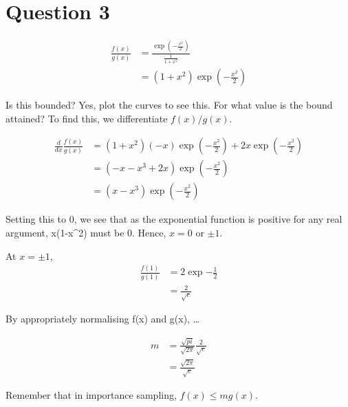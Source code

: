 \documentclass{amsart}
\begin{document}
\section{Question 3}
\begin{align*}
\frac{f(x)}{g(x)} &= \frac{\exp{(-\frac{x^2}{2})}}{\frac{1}{1+x^2}} \\
&= (1+x^2) \exp{(-\frac{x^2}{2})}
\end{align*}

Is this bounded? Yes, plot the curves to see this.
For what value is the bound attained? To find this, we differentiate $f(x)/g(x)$.

\begin{align*}
\frac{d}{dx} \frac{f(x)}{g(x)} &= (1+x^2)(-x) \exp{(-\frac{x^2}{2})} + 2x \exp{(-\frac{x^2}{2})} \\
&= (-x -x^3 + 2x)  \exp{(-\frac{x^2}{2})} \\
&= (x - x^3) \exp{(-\frac{x^2}{2})}
\end{align*}

Setting this to 0, we see that as the exponential function is positive for any real argument,
x(1-x^2) must be 0. Hence, $x=0$ or $\pm 1$.

At $x = \pm 1$,
\begin{align*}
\frac{f(1)}{g(1)} &= 2 \exp{-\frac{1}{2}} \\
&= \frac{2}{\sqrt{e}}
\end{align*}

By appropriately normalising f(x) and g(x), \ldots

\begin{align*}
m &= \frac{\sqrt{pi}}{\sqrt{2 \pi}} \frac{2}{\sqrt{e}}\\
&= \frac{\sqrt{2\pi}}{\sqrt{e}}
\end{align*}

Remember that in importance sampling, $f(x) \leq m g(x)$.
\end{document}
